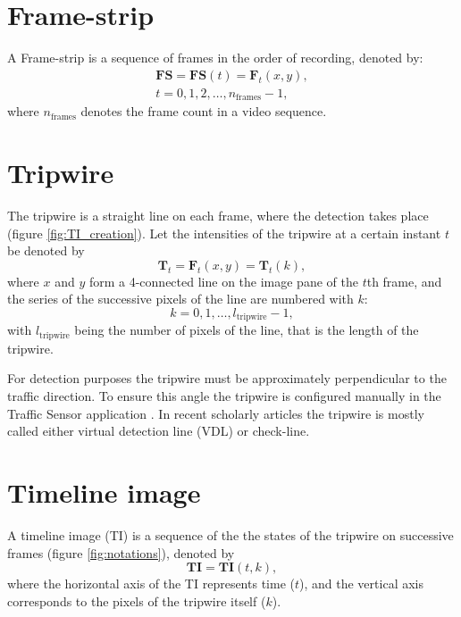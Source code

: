 \section{Frame-strip}
A Frame-strip is a sequence of frames in the order of recording, denoted by:
\begin{gather*}
	\boldsymbol{FS}=\boldsymbol{FS}(t)=\boldsymbol{F}_t(x,y), \\
	t=0,1,2,\dotsc,n_{\text{frames}}-1,
\end{gather*}
where $n_{\text{frames}}$ denotes the frame count in a video sequence.
\section{Tripwire}
The tripwire is a straight line on each frame, where the detection takes place (figure \ref{fig:TI_creation}).
Let the intensities of the tripwire at a certain instant $t$ be denoted by 
\begin{displaymath}
\boldsymbol{T}_t=\boldsymbol{F}_t(x,y)=\boldsymbol{T}_t(k),
\end{displaymath}
where $x$ and $y$ form a 4-connected line on the image pane of the $t$th frame, and the series of the successive pixels of the line are numbered with $k$:
\begin{displaymath}
	k=0,1,\dotsc,l_{\text{tripwire}}-1,
\end{displaymath}
with $l_{\text{tripwire}}$ being the number of pixels of the line, that is the length of the tripwire.

For detection purposes the tripwire must be approximately perpendicular to the traffic direction.
To ensure this angle the tripwire is configured manually in the Traffic Sensor application .
In recent scholarly articles the tripwire is mostly called either virtual detection line (VDL) or check-line.
\section{Timeline image}
A timeline image (TI) is a sequence of the the states of the tripwire on successive frames (figure \ref{fig:notations}), denoted by
\begin{displaymath}
	\boldsymbol{TI}=\boldsymbol{TI}(t,k),
\end{displaymath}
where the horizontal axis of the TI represents time ($t$), and the vertical axis corresponds to the pixels of the tripwire itself ($k$).
 

